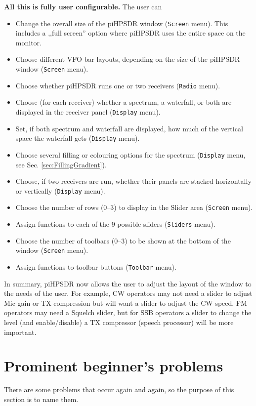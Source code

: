 \documentclass[12pt]{book}
\def\bltt#1{\texttt{\color{blue}#1}}
\def\pH{pi\-HPSDR\xspace}
\begin{document}
\clearpage
\textbf{All this is fully user configurable.} The user can
\begin{itemize}
\item{Change the overall size of the \pH window (\bltt{Screen} menu). This includes
a ,,full screen'' option where \pH uses the entire space on the monitor.}
\item{Choose different VFO bar layouts, depending on the size of the \pH window (\bltt{Screen} menu).}
\item{Choose whether \pH runs one or two receivers (\bltt{Radio} menu).}
\item{Choose (for each receiver) whether a spectrum, a waterfall, or both are displayed in the receiver
panel (\bltt{Display} menu).}
\item{Set, if both spectrum and waterfall are displayed, how much of the vertical space the waterfall
gets (\bltt{Display} menu).}
\item{Choose several filling or colouring options for the spectrum (\bltt{Display} menu, see
Sec. \ref{sec:FillingGradient}).}
\item{Choose, if two receivers are run, whether their panels are stacked horizontally or
vertically (\bltt{Display} menu).}
\item{Choose the number of rows (0--3) to display in the Slider area (\bltt{Screen} menu).}
\item{Assign functions to each of the 9 possible sliders (\bltt{Sliders} menu).}
\item{Choose the number of toolbars (0--3) to be shown at the bottom of the window (\bltt{Screen} menu).}
\item{Assign functions to toolbar buttons (\bltt{Toolbar} menu).}
\end{itemize}

In summary, \pH now allows the user to adjust the layout of the window to the needs of the user.
For example, CW operators
may not need a slider to adjust Mic gain or TX compression but will want a slider to adjust the CW
speed. FM operators may need a Squelch slider, but for SSB operators a slider to change the
level (and enable/disable) a TX compressor (speech processor) will be more important.

\section{Prominent beginner's problems}
There are some problems that occur again and again, so the purpose of this section is to name them.
\end{document}
